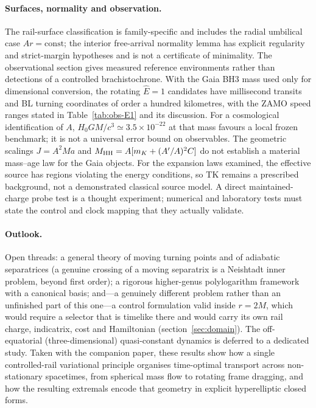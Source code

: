 \documentclass[12pt]{iopart}
\theoremstyle{plain}
\theoremstyle{definition}
\theoremstyle{remark}
\newcommand{\Ehat}{\hat E}
\begin{document}
\paragraph{Surfaces, normality and observation.}
The rail-surface classification is family-specific and includes the
radial umbilical case $Ar=\mathrm{const}$; the interior free-arrival
normality lemma has explicit regularity and strict-margin hypotheses
and is not a certificate of minimality. The observational section gives
measured reference environments rather than detections of a controlled
brachistochrone. With the Gaia BH3 mass used only for dimensional
conversion, the rotating $\Ehat=1$ candidates have millisecond transits
and BL turning coordinates of order a hundred kilometres, with the
ZAMO speed ranges stated in Table~\ref{tab:obs-E1} and its discussion.
For a cosmological identification of $A$, $H_0GM/c^3\simeq3.5\times10^{-22}$
at that mass favours a local frozen benchmark; it is not a universal
error bound on observables. The geometric scalings $J=A^2Ma$ and
$M_{\rm HH}=A[m_K+(A'/A)^2C]$ do not establish a material mass--age
law for the Gaia objects. For the expansion laws examined, the effective
source has regions violating the energy conditions, so TK remains a
prescribed background, not a demonstrated classical source model.
A direct maintained-charge probe test is a thought experiment;
numerical and laboratory tests must state the control and clock mapping
that they actually validate.

\paragraph{Outlook.} Open threads: a general theory of moving turning points and of
adiabatic separatrices (a genuine crossing of a moving separatrix is a Neishtadt inner
problem, beyond first order); a rigorous higher-genus polylogarithm framework with a
canonical basis; and---a genuinely different problem rather than an unfinished part of
this one---a control formulation valid inside $r=2M$, which would require a selector that
is timelike there and would carry its own rail charge, indicatrix, cost and Hamiltonian
(section~\ref{sec:domain}). The off-equatorial
(three-dimensional) quasi-constant dynamics is deferred to a dedicated study.
Taken with the companion paper, these results show how a single controlled-rail
variational principle organises time-optimal transport across non-stationary spacetimes,
from spherical mass flow to rotating frame dragging, and how the resulting extremals
encode that geometry in explicit hyperelliptic closed forms.
\end{document}
